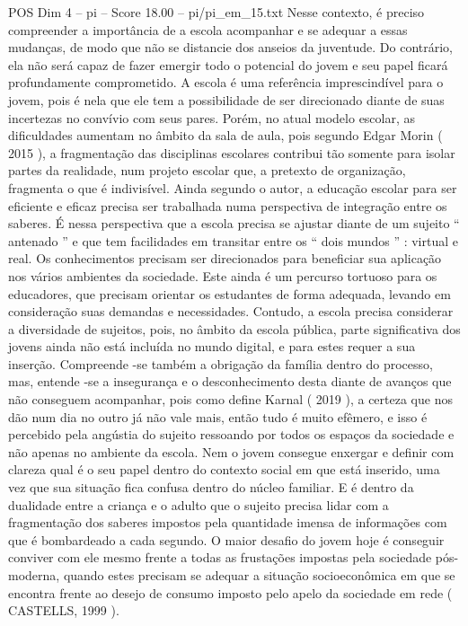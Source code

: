 \begin{textsample}{POS Dim 4 – pi – Score 18.00 – pi/pi\_em\_15.txt}
Nesse contexto, é preciso compreender a importância de a escola acompanhar e se adequar a essas mudanças, de modo que não se distancie dos anseios da juventude.
Do contrário, ela não será capaz de fazer emergir todo o potencial do jovem e seu papel ficará profundamente comprometido.
A escola é uma referência imprescindível para o jovem, pois é nela que ele tem a possibilidade de ser direcionado diante de suas incertezas no convívio com seus pares.
Porém, no atual modelo escolar, as dificuldades aumentam no âmbito da sala de aula, pois segundo Edgar Morin ( 2015 ), a fragmentação das disciplinas escolares contribui tão somente para isolar partes da realidade, num projeto escolar que, a pretexto de organização, fragmenta o que é indivisível.
Ainda segundo o autor, a educação escolar para ser eficiente e eficaz precisa ser trabalhada numa perspectiva de integração entre os saberes.
É nessa perspectiva que a escola precisa se ajustar diante de um sujeito “ antenado ” e que tem facilidades em transitar entre os “ dois mundos ” : virtual e real.
Os conhecimentos precisam ser direcionados para beneficiar sua aplicação nos vários ambientes da sociedade.
Este ainda é um percurso tortuoso para os educadores, que precisam orientar os estudantes de forma adequada, levando em consideração suas demandas e necessidades.
Contudo, a escola precisa considerar a diversidade de sujeitos, pois, no âmbito da escola pública, parte significativa dos jovens ainda não está incluída no mundo digital, e para estes requer a sua inserção.
Compreende -se também a obrigação da família dentro do processo, mas, entende -se a insegurança e o desconhecimento desta diante de avanços que não conseguem acompanhar, pois como define Karnal ( 2019 ), a certeza que nos dão num dia no outro já não vale mais, então tudo é muito efêmero, e isso é percebido pela angústia do sujeito ressoando por todos os espaços da sociedade e não apenas no ambiente da escola.
Nem o jovem consegue enxergar e definir com clareza qual é o seu papel dentro do contexto social em que está inserido, uma vez que sua situação fica confusa dentro do núcleo familiar.
E é dentro da dualidade entre a criança e o adulto que o sujeito precisa lidar com a fragmentação dos saberes impostos pela quantidade imensa de informações com que é bombardeado a cada segundo.
O maior desafio do jovem hoje é conseguir conviver com ele mesmo frente a todas as frustações impostas pela sociedade pós-moderna, quando estes precisam se adequar a situação socioeconômica em que se encontra frente ao desejo de consumo imposto pelo apelo da sociedade em rede ( CASTELLS, 1999 ).

\end{textsample}
